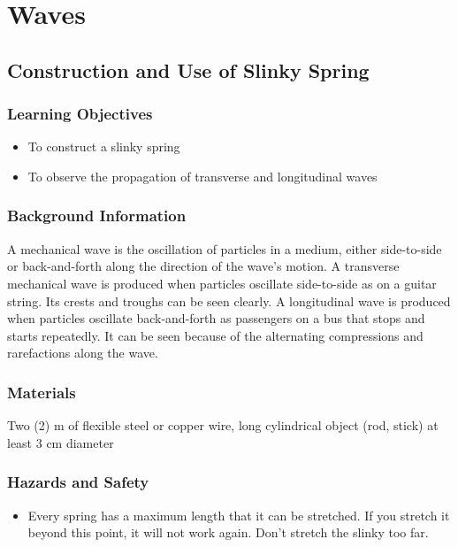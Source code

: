 \section{Waves}

\subsection{Construction and Use of Slinky Spring}

\subsubsection*{Learning Objectives}
\begin{itemize}
\item{To construct a slinky spring} 
\item{To observe the propagation of transverse and longitudinal waves} 
\end{itemize}

\subsubsection*{Background Information}
A mechanical wave is the oscillation of particles in a medium, either side-to-side or back-and-forth along the direction of the wave's motion. A transverse mechanical wave is produced when particles oscillate side-to-side as on a guitar string. Its crests and troughs can be seen clearly. A longitudinal wave is produced when particles oscillate back-and-forth as passengers on a bus that stops and starts repeatedly. It can be seen because of the alternating compressions and rarefactions along the wave.  

\subsubsection*{Materials}
Two (2) m of flexible steel or copper wire, long cylindrical object (rod, stick) at least 3 cm diameter

\subsubsection*{Hazards and Safety}
\begin{itemize}
\item{Every spring has a maximum length that it can be stretched. If you stretch it beyond this point, it will not work again. Don't stretch the slinky too far.} 
\end{itemize}

